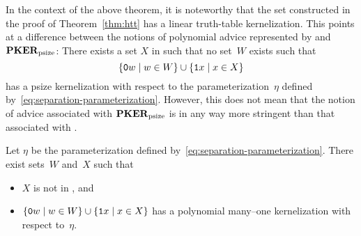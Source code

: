 In the context of the above theorem, it is noteworthy that the set constructed in the proof of Theorem~\ref{thm:htt} has a linear truth-table kernelization.
This points at a difference between the notions of polynomial advice represented by  and $\textnormal{\textbf{PKER}}_\textnormal{psize}$:
There exists a set $X$ in  such that no set~$W$ exists such that
\begin{equation*}
  \{\textnormal{\texttt{0}}w \;|\; w \in W\} \cup \{\textnormal{\texttt{1}}x \;|\; x \in X\}
\end{equation*}
has a psize kernelization with respect to the parameterization~$\eta$ defined by~\eqref{eq:separation-parameterization}.
However, this does not mean that the notion of advice associated with $\textnormal{\textbf{PKER}}_\textnormal{psize}$ is in any way more stringent than that associated with .
\begin{theorem}
\label{thm:ppoly-one}%
  Let $\eta$ be the parameterization defined by~\eqref{eq:separation-parameterization}.
  There exist sets~$W$ and~$X$ such that
  \begin{itemize}
  \item $X$ is not in , and
  \item $\{\textnormal{\texttt{0}}w \;|\; w \in W\} \cup \{\textnormal{\texttt{1}}x \;|\; x \in X\}$ has a polynomial many--one kernelization with respect to~$\eta$.
  \end{itemize}
\end{theorem}
